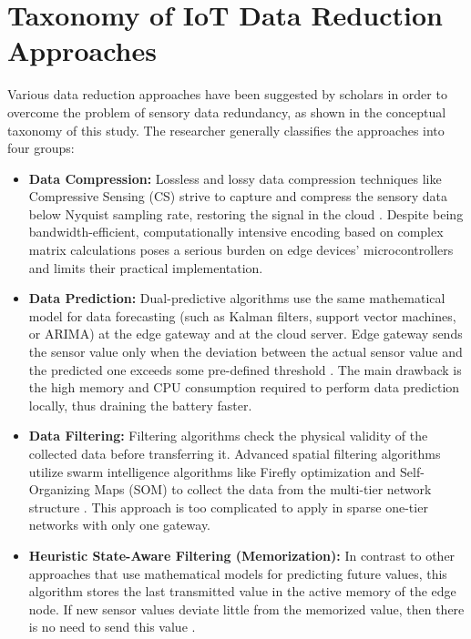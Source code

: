 \section{Taxonomy of IoT Data Reduction Approaches}
Various data reduction approaches have been suggested by scholars in order to overcome the problem of sensory data redundancy, as shown in the conceptual taxonomy of this study. The researcher generally classifies the approaches into four groups:
\begin{itemize}
  \item \textbf{Data Compression:} Lossless and lossy data compression techniques like Compressive Sensing (CS) strive to capture and compress the sensory data below Nyquist sampling rate, restoring the signal in the cloud \cite{ref18, ref38, ref58}. Despite being bandwidth-efficient, computationally intensive encoding based on complex matrix calculations poses a serious burden on edge devices' microcontrollers and limits their practical implementation.
    \item \textbf{Data Prediction:} Dual-predictive algorithms use the same mathematical model for data forecasting (such as Kalman filters, support vector machines, or ARIMA) at the edge gateway and at the cloud server. Edge gateway sends the sensor value only when the deviation between the actual sensor value and the predicted one exceeds some pre-defined threshold \cite{ref4, ref24, ref44}. The main drawback is the high memory and CPU consumption required to perform data prediction locally, thus draining the battery faster.
    \item \textbf{Data Filtering:} Filtering algorithms check the physical validity of the collected data before transferring it. Advanced spatial filtering algorithms utilize swarm intelligence algorithms like Firefly optimization and Self-Organizing Maps (SOM) to collect the data from the multi-tier network structure \cite{ref17, ref37, ref57}. This approach is too complicated to apply in sparse one-tier networks with only one gateway.
    \item \textbf{Heuristic State-Aware Filtering (Memorization):} In contrast to other approaches that use mathematical models for predicting future values, this algorithm stores the last transmitted value in the active memory of the edge node. If new sensor values deviate little from the memorized value, then there is no need to send this value \cite{ref15, ref35, ref55, ref16, ref36, ref56}.
\end{itemize}

